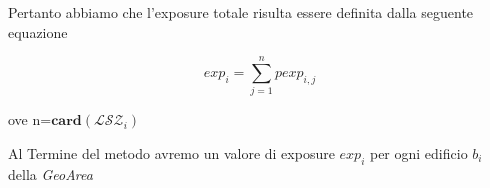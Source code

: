 Pertanto abbiamo che l'exposure totale risulta essere definita dalla seguente equazione

\begin{equation}\label{eq:exposure1}
exp_i =\sum_{j=1}^n pexp_{i,j}
\end{equation}

ove n=$\mathbf{card}(\mathcal{LSZ}_i)$
\bigbreak

Al Termine del metodo avremo un valore di exposure $exp_i$ per ogni edificio $b_i$ della \textit{GeoArea}






